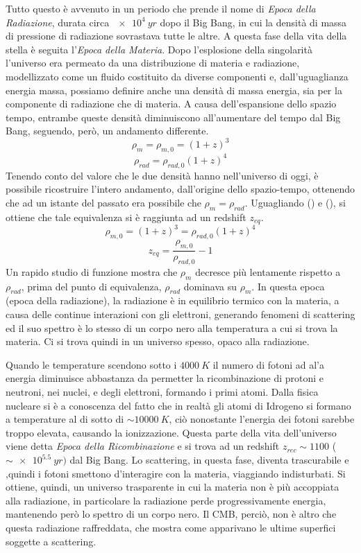 Tutto questo è avvenuto in un periodo che prende il nome di \textit{Epoca della Radiazione}, durata circa $\SI{e4}{yr}$ dopo il Big Bang, in cui la densità di massa di pressione di radiazione sovrastava tutte le altre. A questa fase della vita della stella è seguita l'\textit{Epoca della Materia}. Dopo l'esplosione della singolarità l'universo era permeato da una distribuzione di materia e radiazione, modellizzato come un fluido costituito da diverse componenti e, dall'uguaglianza energia massa, possiamo definire anche una densità di massa energia, sia per la componente di radiazione che di materia. A causa dell'espansione dello spazio tempo, entrambe queste densità diminuiscono all'aumentare del tempo dal Big Bang, seguendo, però, un andamento differente.
\begin{equation}\label{eq:densita-massa}
    \rho_m = \rho_{m,0} = {(1+z)}^3
\end{equation}
\begin{equation}\label{eq:densita-radiazione}
    \rho_{rad}=\rho_{rad, 0} {(1+z)}^4
\end{equation}
Tenendo conto del valore che le due densità hanno nell'universo di oggi, è possibile ricostruire l'intero andamento, dall'origine dello spazio-tempo, ottenendo che ad un istante del passato era possibile che $\rho_m = \rho_{rad}$. Uguagliando () e (), si ottiene che tale equivalenza si è raggiunta ad un redshift $z_{eq}$.
\[
    \rho_{m,0} = {(1+z)}^3 = \rho_{rad, 0} {(1+z)}^4
\]
\[
    z_{eq} = \frac{\rho_{m,0}}{\rho_{rad, 0}} - 1
\]
Un rapido studio di funzione mostra che $\rho_m$ decresce più lentamente rispetto a $\rho_{rad}$, prima del punto di equivalenza, $\rho_{rad}$ dominava su $\rho_{m}$. In questa epoca (epoca della radiazione), la radiazione è in equilibrio termico con la materia, a causa delle continue interazioni con gli elettroni, generando fenomeni di scattering ed il suo spettro è lo stesso di un corpo nero alla temperatura a cui si trova la materia. Ci si trova quindi in un universo spesso, opaco alla radiazione.

Quando le temperature scendono sotto i $\SI{4000}{K}$ il numero di fotoni ad al'a energia diminuisce abbastanza da permetter la ricombinazione di protoni e neutroni, nei nuclei, e degli elettroni, formando i primi atomi. Dalla fisica nucleare si è a conoscenza del fatto che in realtà gli atomi di Idrogeno si formano a temperature al di sotto di $\sim \SI{10000}{K}$, ciò nonostante l'energia dei fotoni sarebbe troppo elevata, causando la ionizzazione. Questa parte della vita dell'universo viene detta \textit{Epoca della Ricombinazione} e si trova ad un redshift $z_{rec} \sim 1100$ ($\sim \SI{e5.5}{yr})$ dal Big Bang. Lo scattering, in questa fase, diventa trascurabile e ,quindi i fotoni smettono d'interagire con la materia, viaggiando indisturbati. Si ottiene, quindi, un universo trasparente in cui la materia non è più accoppiata alla radiazione, in particolare la radiazione perde progressivamente energia, mantenendo però lo spettro di un corpo nero. Il CMB, perciò, non è altro che questa radiazione raffreddata, che mostra come apparivano le ultime superfici soggette a scattering.

